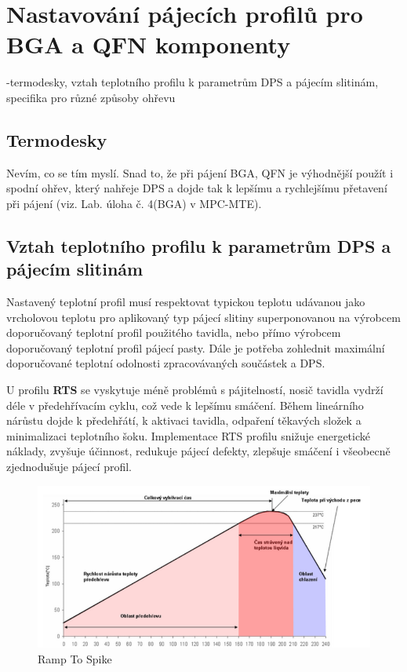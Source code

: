 \section{Nastavování pájecích profilů pro BGA a QFN komponenty}
-termodesky, vztah teplotního profilu k parametrům DPS a pájecím slitinám, specifika pro různé způsoby ohřevu

\subsection{Termodesky}
Nevím, co se tím myslí. Snad to, že při pájení BGA, QFN je výhodnější použít i spodní ohřev, který nahřeje DPS a dojde tak k lepšímu a rychlejšímu přetavení při pájení (viz. Lab. úloha č. 4(BGA) v MPC-MTE).

\subsection{Vztah teplotního profilu k parametrům DPS a pájecím slitinám}
Nastavený teplotní profil musí respektovat typickou teplotu udávanou jako vrcholovou
teplotu pro aplikovaný typ pájecí slitiny superponovanou na výrobcem doporučovaný teplotní
profil použitého tavidla, nebo přímo výrobcem doporučovaný teplotní profil pájecí pasty. Dále
je potřeba zohlednit maximální doporučované teplotní odolnosti zpracovávaných součástek
a DPS.

U profilu \textbf{RTS} se vyskytuje méně problémů s pájitelností, nosič
tavidla vydrží déle v předehřívacím cyklu, což vede k lepšímu smáčení. Během lineárního
nárůstu dojde k předehřátí, k aktivaci tavidla, odpaření těkavých složek a minimalizaci teplotního šoku. Implementace RTS profilu snižuje energetické náklady, zvyšuje účinnost, redukuje pájecí defekty, zlepšuje smáčení i všeobecně zjednodušuje pájecí profil.

\begin{figure}[h]
   \begin{center}
     \includegraphics[scale=0.6]{images/RTS.png}
   \end{center}
   \caption{Ramp To Spike}
\end{figure}

